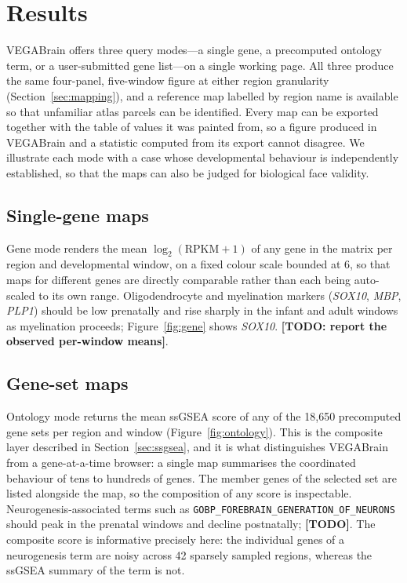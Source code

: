 \documentclass[pdflatex,sn-basic]{sn-jnl}
\begin{document}
\section{Results}\label{sec:results}

VEGABrain offers three query modes---a single gene, a precomputed ontology term,
or a user-submitted gene list---on a single working page.
All three produce the same four-panel, five-window
figure at either region granularity (Section~\ref{sec:mapping}), and a
reference map labelled by region name is available so that unfamiliar atlas
parcels can be identified. Every map can be exported together with the table of
values it was painted from, so a figure produced in VEGABrain and a statistic
computed from its export cannot disagree. We illustrate each mode with a case
whose developmental behaviour is independently established, so that the maps
can also be judged for biological face validity.


\subsection{Single-gene maps}

Gene mode renders the mean $\log_2(\mathrm{RPKM}+1)$ of any gene in the matrix
per region and developmental window, on a fixed colour scale bounded at 6, so
that maps for different genes are directly comparable rather than each being
auto-scaled to its own range. Oligodendrocyte and myelination markers
(\emph{SOX10}, \emph{MBP}, \emph{PLP1}) should be low prenatally and rise
sharply in the infant and adult windows as myelination proceeds;
Figure~\ref{fig:gene} shows \emph{SOX10}. \textbf{[TODO: report the observed
per-window means]}.

\subsection{Gene-set maps}

Ontology mode returns the mean ssGSEA score of any of the 18{,}650 precomputed
gene sets per region and window (Figure~\ref{fig:ontology}). This is the
composite layer described in Section~\ref{sec:ssgsea}, and it is what
distinguishes VEGABrain from a gene-at-a-time browser: a single map summarises
the coordinated behaviour of tens to hundreds of genes. The member genes of the
selected set are listed alongside the map, so the composition of any score is
inspectable. Neurogenesis-associated terms such as
\texttt{GOBP\_FOREBRAIN\_GENERATION\_OF\_NEURONS} should peak in the prenatal
windows and decline postnatally; \textbf{[TODO]}. The composite score is
informative precisely here: the individual genes of a neurogenesis term are
noisy across 42 sparsely sampled regions, whereas the ssGSEA summary of the
term is not.
\end{document}
